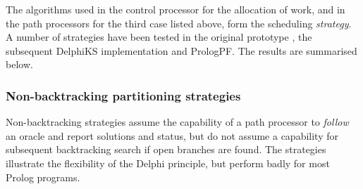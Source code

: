 The algorithms used in the control processor for the allocation of work, and
in the path processors for the third case listed above, form the
scheduling \textit{strategy}.  A number of strategies have been tested in
the original prototype \cite{AM88}, the subsequent DelphiKS implementation \cite{Kle91}
and PrologPF.  The results are summarised below.

\subsubsection{Non-backtracking partitioning strategies}

Non-backtracking strategies assume the capability of a path processor to
\textit{follow} an oracle and report solutions and status, but do not
assume a capability for subsequent backtracking search if open branches are
found.  The strategies illustrate the flexibility of the Delphi principle,
but perform badly for most Prolog programs.
